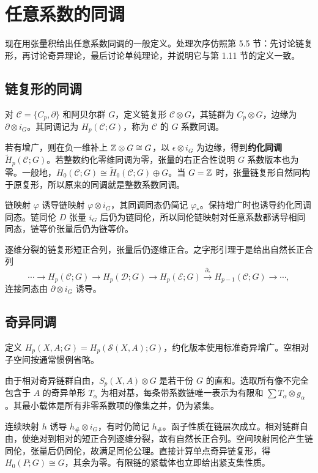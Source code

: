 \section{任意系数的同调}
现在用张量积给出任意系数同调的一般定义。处理次序仿照第 5.5 节：先讨论链复形，再讨论奇异理论，最后讨论单纯理论，并说明它与第 1.11 节的定义一致。

\subsection*{链复形的同调}
对 $\mathcal C=\{C_p,\partial\}$ 和阿贝尔群 $G$，定义链复形 $\mathcal C\otimes G$，其链群为 $C_p\otimes G$，边缘为 $\partial\otimes i_G$。其同调记为 $H_p(\mathcal C;G)$，称为 $\mathcal C$ 的 $G$ 系数同调。

若有增广，则在负一维补上 $\mathbb{Z}\otimes G\cong G$，以 $\epsilon\otimes i_G$ 为边缘，得到\textbf{约化同调} $\widetilde H_p(\mathcal C;G)$。若整数约化零维同调为零，张量的右正合性说明 $G$ 系数版本也为零。一般地，$H_0(\mathcal C;G)\cong\widetilde H_0(\mathcal C;G)\oplus G$。当 $G=\mathbb{Z}$ 时，张量链复形自然同构于原复形，所以原来的同调就是整数系数同调。

链映射 $\varphi$ 诱导链映射 $\varphi\otimes i_G$，其同调同态仍简记 $\varphi_*$。保持增广时也诱导约化同调同态。链同伦 $D$ 张量 $i_G$ 后仍为链同伦，所以同伦链映射对任意系数都诱导相同同态，链等价张量后仍为链等价。

逐维分裂的链复形短正合列，张量后仍逐维正合。之字形引理于是给出自然长正合列
\[
\cdots\to H_p(\mathcal C;G)\to H_p(\mathcal D;G)\to H_p(\mathcal E;G)
\xrightarrow{\partial_*}H_{p-1}(\mathcal C;G)\to\cdots,
\]
连接同态由 $\partial\otimes i_G$ 诱导。

\subsection*{奇异同调}
定义 $H_p(X,A;G)=H_p(\mathcal S(X,A);G)$，约化版本使用标准奇异增广。空相对子空间按通常惯例省略。

由于相对奇异链群自由，$S_p(X,A)\otimes G$ 是若干份 $G$ 的直和。选取所有像不完全包含于 $A$ 的奇异单形 $T_\alpha$ 为相对基，每条带系数链唯一表示为有限和 $\sum T_\alpha\otimes g_\alpha$。其最小载体是所有非零系数项的像集之并，仍为紧集。

连续映射 $h$ 诱导 $h_\#\otimes i_G$，有时仍简记 $h_\#$。函子性质在链层次成立。相对链群自由，使绝对到相对的短正合列逐维分裂，故有自然长正合列。空间映射同伦产生链同伦，张量后仍同伦，故满足同伦公理。直接计算单点奇异链复形，得 $H_0(P;G)\cong G$，其余为零。有限链的紧载体也立即给出紧支集性质。

